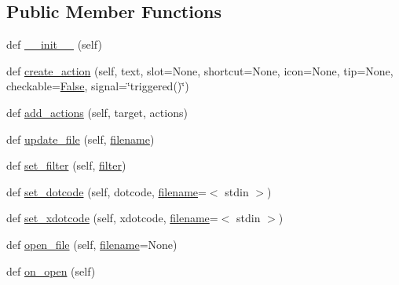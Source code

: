 \subsection*{Public Member Functions}
\begin{DoxyCompactItemize}
\item 
def \hyperlink{classsmacc__viewer_1_1xdot_1_1xdot__qt_1_1DotWindow_ae12877713195badacce5a0cb3feb299c}{\+\_\+\+\_\+init\+\_\+\+\_\+} (self)
\item 
def \hyperlink{classsmacc__viewer_1_1xdot_1_1xdot__qt_1_1DotWindow_ae443e00705b869417f630254683e5526}{create\+\_\+action} (self, text, slot=None, shortcut=None, icon=None, tip=None, checkable=\hyperlink{namespacesmacc__viewer_a5928e8da279785cbab9011356c3eaa87}{False}, signal=\char`\"{}triggered()\char`\"{})
\item 
def \hyperlink{classsmacc__viewer_1_1xdot_1_1xdot__qt_1_1DotWindow_ac5e2f89ee361411b49a405c888ef4117}{add\+\_\+actions} (self, target, actions)
\item 
def \hyperlink{classsmacc__viewer_1_1xdot_1_1xdot__qt_1_1DotWindow_ad630302625710c28ea44d23f39b7a7dd}{update\+\_\+file} (self, \hyperlink{classsmacc__viewer_1_1xdot_1_1xdot__qt_1_1DotWindow_a8be84c72284dbb6ae2d6e65a03617b23}{filename})
\item 
def \hyperlink{classsmacc__viewer_1_1xdot_1_1xdot__qt_1_1DotWindow_aef986e31538c00f00e8863462c23db9f}{set\+\_\+filter} (self, \hyperlink{namespacesmacc__viewer_1_1xdot_1_1xdot__qt_a3e281a7b487568916dc614e2edd9f120}{filter})
\item 
def \hyperlink{classsmacc__viewer_1_1xdot_1_1xdot__qt_1_1DotWindow_a2141ab9b12d0e8b2c28e78410457defb}{set\+\_\+dotcode} (self, dotcode, \hyperlink{classsmacc__viewer_1_1xdot_1_1xdot__qt_1_1DotWindow_a8be84c72284dbb6ae2d6e65a03617b23}{filename}=\textquotesingle{}$<$ stdin $>$\textquotesingle{})
\item 
def \hyperlink{classsmacc__viewer_1_1xdot_1_1xdot__qt_1_1DotWindow_a4acd3e468de7fb2f9b7daa0238aef16a}{set\+\_\+xdotcode} (self, xdotcode, \hyperlink{classsmacc__viewer_1_1xdot_1_1xdot__qt_1_1DotWindow_a8be84c72284dbb6ae2d6e65a03617b23}{filename}=\textquotesingle{}$<$ stdin $>$\textquotesingle{})
\item 
def \hyperlink{classsmacc__viewer_1_1xdot_1_1xdot__qt_1_1DotWindow_ae64c4931d5b5fa9733c1a1ff879db35f}{open\+\_\+file} (self, \hyperlink{classsmacc__viewer_1_1xdot_1_1xdot__qt_1_1DotWindow_a8be84c72284dbb6ae2d6e65a03617b23}{filename}=None)
\item 
def \hyperlink{classsmacc__viewer_1_1xdot_1_1xdot__qt_1_1DotWindow_a94129f5cd64f5b95f9a4127c454fad00}{on\+\_\+open} (self)

\end{DoxyCompactItemize}
